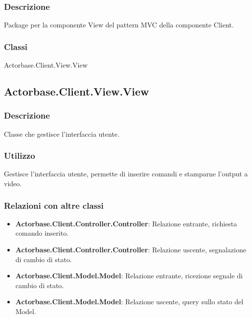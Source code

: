 \documentclass[a4paper]{article}
\begin{document}
			\subsubsection{Descrizione}
				Package per la componente View del pattern MVC della componente Client.
			\subsubsection{Classi}
				Actorbase.Client.View.View

		
		\subsection{Actorbase.Client.View.View}	
			\subsubsection{Descrizione}
				Classe che gestisce l'interfaccia utente.
			\subsubsection{Utilizzo}
				Gestisce l'interfaccia utente, permette di inserire comandi e stamparne l'output a video.
			\subsubsection{Relazioni con altre classi}
				\begin{itemize}
					\item \textbf{Actorbase.Client.Controller.Controller}: Relazione entrante, richiesta comando inserito.
					\item \textbf{Actorbase.Client.Controller.Controller}: Relazione uscente, segnalazione di cambio di stato.
					\item \textbf{Actorbase.Client.Model.Model}: Relazione entrante, ricezione segnale di cambio di stato.
					\item \textbf{Actorbase.Client.Model.Model}: Relazione uscente, query sullo stato del Model.
				\end{itemize}
				
				
				
\end{document}
